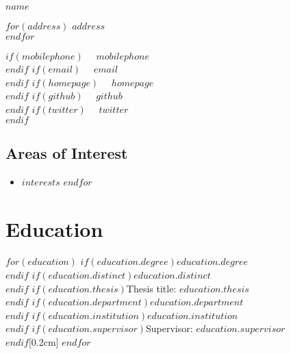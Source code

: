 \documentclass[$fontsize$, a4paper]{article}
\newcommand{\mobilephonesymbol}   {{\Large\faMobilePhone}~~}
\newcommand{\emailsymbol}         {\faEnvelope~~}           %
\newcommand{\homepagesymbol}      {\faGlobe~~}              %
\newcommand{\twittersymbol} {\faTwitter~~}
\newcommand{\githubsymbol}  {\faGithub~~}
\newcommand{\note}[1]{\marginnote{\small #1}}
\begin{document}
\flushleft

{\LARGE $name$}\\[.2cm]

\begin{multicols}{2}
$for(address)$
$address$\\
$endfor$

\vspace{10pt}

$if(mobilephone)$
\mobilephonesymbol$mobilephone$\\
$endif$
$if(email)$
\emailsymbol\href{mailto:$email$}{$email$}\\
$endif$
$if(homepage)$
\homepagesymbol\href{http://$homepage$}{$homepage$}\\
$endif$
$if(github)$
\githubsymbol\href{http://github.com/$github$}{$github$}\\
$endif$
$if(twitter)$
\twittersymbol\href{http://twitter.com/$twitter$}{$twitter$}\\
$endif$

\columnbreak

\subsection*{Areas of Interest}
\begin{itemize}
    $for(interests)$
      \item $interests$
    $endfor$
\end{itemize}

\end{multicols}

\vspace{15pt}

\section*{Education}
\noindent
$for(education)$
\note{$education.time$}$if(education.degree)$$education.degree$\\$endif$
$if(education.distinct)$$education.distinct$\\$endif$
$if(education.thesis)$Thesis title: \textbf{$education.thesis$}\\$endif$
$if(education.department)$\emph{$education.department$}\\$endif$
$if(education.institution)$\emph{$education.institution$}\\$endif$
$if(education.supervisor)$Supervisor: \href{mailto:$education.superemail$}{$education.supervisor$}\\$endif$[0.2cm]
$endfor$
\vspace{10pt}
\end{document}
